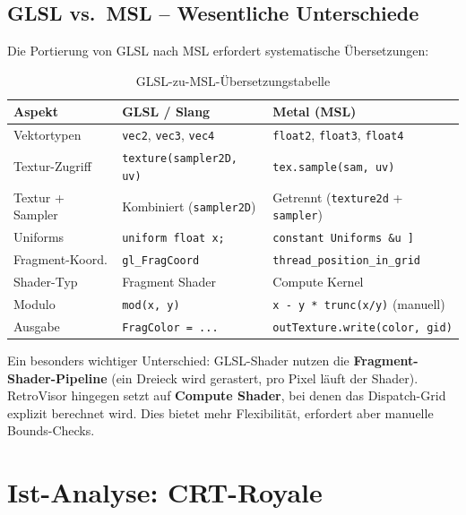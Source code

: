 \documentclass[11pt, a4paper]{article}
\newcommand{\tableheadercolor}{\rowcolor{hkared}}
\newcommand{\thw}[1]{\color{white}\textbf{#1}}  %
\begin{document}
\subsection{GLSL vs.\ MSL -- Wesentliche Unterschiede}
\vspace{.5cm}
Die Portierung von GLSL nach MSL erfordert systematische \"Ubersetzungen:
\vspace{.25cm}
\begin{table}[H]
\centering
\small
{}
\begin{tabularx}{\textwidth}{lXX}
    \toprule
    \tableheadercolor \thw{Aspekt} & \thw{GLSL / Slang} & \thw{Metal (MSL)} \\
    \midrule
    Vektortypen & \texttt{vec2}, \texttt{vec3}, \texttt{vec4} & \texttt{float2}, \texttt{float3}, \texttt{float4} \\
    Textur-Zugriff & \texttt{texture(sampler2D, uv)} & \texttt{tex.sample(sam, uv)} \\
    Textur + Sampler & Kombiniert (\texttt{sampler2D}) & Getrennt (\texttt{texture2d} + \texttt{sampler}) \\
    Uniforms & \texttt{uniform float x;} & \texttt{constant Uniforms \&u \newline [[ buffer(0) ]]} \\
    Fragment-Koord. & \texttt{gl\_FragCoord} & \texttt{thread\_position\_in\_grid} \\
    Shader-Typ & Fragment Shader & Compute Kernel \\
    Modulo & \texttt{mod(x, y)} & \texttt{x - y * trunc(x/y)} (manuell) \\
    Ausgabe & \texttt{FragColor = ...} & \texttt{outTexture.write(color, gid)} \\
    \bottomrule
\end{tabularx}
\caption{GLSL-zu-MSL-\"Ubersetzungstabelle}
\end{table}

Ein besonders wichtiger Unterschied: GLSL-Shader nutzen die \textbf{Fragment-Shader-Pipeline} (ein Dreieck wird gerastert, pro Pixel l\"auft der Shader). RetroVisor hingegen setzt auf \textbf{Compute Shader}, bei denen das Dispatch-Grid explizit berechnet wird. Dies bietet mehr Flexibilit\"at, erfordert aber manuelle Bounds-Checks.
\vspace{.75cm}
\section{Ist-Analyse: CRT-Royale}
\vspace{.5cm}
\end{document}
